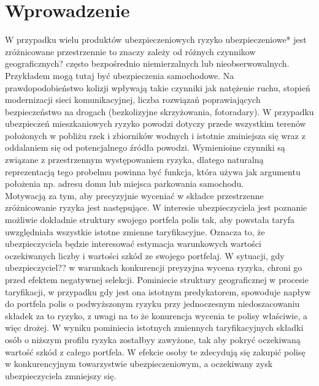 \documentclass[polish, twoside, 12pt, a4paper]{article}
\theoremstyle{definition}
\theoremstyle{plain}
\theoremstyle{remark}
\begin{document}
\clearpage

\cleardoublepage
\tableofcontents

\cleardoublepage
\section{Wprowadzenie}


W przypadku wielu produktów ubezpieczeniowych ryzyko ubezpieczeniowe* jest zróżnicowane przestrzennie to znaczy zależy od różnych czynnikow geograficznych? często bezpośrednio niemierzalnych lub nieobserwowalnych. 
Przykładem mogą tutaj być ubezpieczenia samochodowe. Na prawdopodobieństwo kolizji wpływają takie czynniki jak natężenie ruchu, stopień modernizacji sieci komunikacyjnej, liczba rozwiązań poprawiających bezpieczeństwo na drogach (bezkolizyjne skrzyżowania, fotoradary). W przypadku ubezpieczeń mieszkaniowych ryzyko powodzi dotyczy przede wszystkim terenów położonych w pobliżu rzek i zbiorników wodnych i istotnie zminiejsza się wraz z oddalaniem się od potencjalnego źródła powodzi. Wymienioine czynniki są związane z przestrzennym występowaniem ryzyka, dlatego naturalną reprezentacją tego probelmu powinna być funkcja, która używa jak argumentu położenia np. adresu domu lub miejsca parkowania samochodu.\\

Motywacją za tym, aby precyzyjnie wyceniać w składce przestrzenne zróżnicowanie ryzyka jest następujące. W interesie ubezpieczyciela jest poznanie możliwie dokładnie struktury swojego portfela polis tak, aby powstała taryfa uwzględniała wszystkie istotne zmienne taryfikacyjne. Oznacza to, że ubezpieczyciela będzie interesować estymacja warunkowych wartości oczekiwanych liczby i wartości szkód ze swojego portfelaj. W sytuacji, gdy ubezpieczyciel?? w warunkach konkurencji preyzyjna wycena ryzyka, chroni go przed efektem negatywnej selekcji.  Pominiecie struktury geograficznej w procesie taryfikacji, w przypadku gdy jest ona istotnym predykatorem, spowoduje napływ do portfela polis o podwyższonym ryzyku przy jednoczesnym niedoszacowaniu składek za to ryzyko, z uwagi na to że konurencja wycenia te polisy właściwie, a więc drożej. W wyniku pominiecia istotnych zmiennych taryfikacyjnych składki osób o niższym profilu ryzyka zostałbyy zawyżone, tak aby pokryć oczekiwaną wartość szkód z  całego portfela. W efekcie osoby te zdecydują się zakupić polisę w konkurencyjnym towarzystwie ubezpieczeniowym, a oczekiwany zysk ubezpieczyciela zmniejszy się. \\
\end{document}
